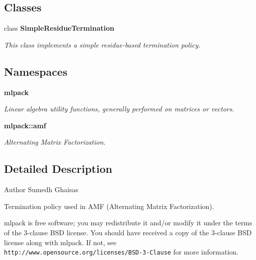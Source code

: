 \subsection*{Classes}
\begin{DoxyCompactItemize}
\item 
class \textbf{ Simple\+Residue\+Termination}
\begin{DoxyCompactList}\small\item\em This class implements a simple residue-\/based termination policy. \end{DoxyCompactList}\end{DoxyCompactItemize}
\subsection*{Namespaces}
\begin{DoxyCompactItemize}
\item 
 \textbf{ mlpack}
\begin{DoxyCompactList}\small\item\em Linear algebra utility functions, generally performed on matrices or vectors. \end{DoxyCompactList}\item 
 \textbf{ mlpack\+::amf}
\begin{DoxyCompactList}\small\item\em Alternating Matrix Factorization. \end{DoxyCompactList}\end{DoxyCompactItemize}


\subsection{Detailed Description}
\begin{DoxyAuthor}{Author}
Sumedh Ghaisas
\end{DoxyAuthor}
Termination policy used in A\+MF (Alternating Matrix Factorization).

mlpack is free software; you may redistribute it and/or modify it under the terms of the 3-\/clause B\+SD license. You should have received a copy of the 3-\/clause B\+SD license along with mlpack. If not, see {\tt http\+://www.\+opensource.\+org/licenses/\+B\+S\+D-\/3-\/\+Clause} for more information. 